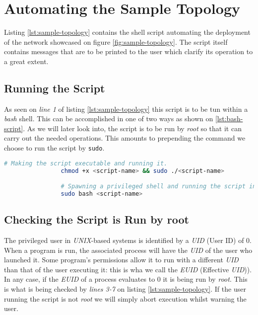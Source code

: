     \section{Automating the Sample Topology}
        Listing \ref{lst:sample-topology} contains the shell script automating the deployment of the network showcased on figure \ref{fig:sample-topology}. The script itself contains messages that are to be printed to the user which clarify its operation to a great extent.\\

        \subsection{Running the Script}
            As seen on \textit{line 1} of listing \ref{lst:sample-topology} this script is to be tun within a \textit{bash} shell. This can be accomplished in one of two ways as shown on \ref{lst:bash-script}. As we will later look into, the script is to be run by \textit{root} so that it can carry out the needed operations. This amounts to prepending the command we choose to run the script by \texttt{sudo}.\\

            \begin{lstlisting}[language = bash, caption = Running a \textit{bash} Script., label = lst:bash-script]
                # Making the script executable and running it.
                chmod +x <script-name> && sudo ./<script-name>

                # Spawning a privileged shell and running the script in it.
                sudo bash <script-name>
            \end{lstlisting}

        \subsection{Checking the Script is Run by root}
            The privileged user in \textit{UNIX}-based systems is identified by a \textit{UID} (User ID) of $0$. When a program is run, the associated process will have the \textit{UID} of the user who launched it. Some program's permissions allow it to run with a different \textit{UID} than that of the user executing it: this is wha we call the \textit{EUID} (Effective \textit{UID})). In any case, if the \textit{EUID} of a process evaluates to $0$ it is being run by \textit{root}. This is what is being checked by \textit{lines 3-7} on listing \ref{lst:sample-topology}. If the user running the script is not \textit{root} we will simply abort execution whilst warning the user.\\

